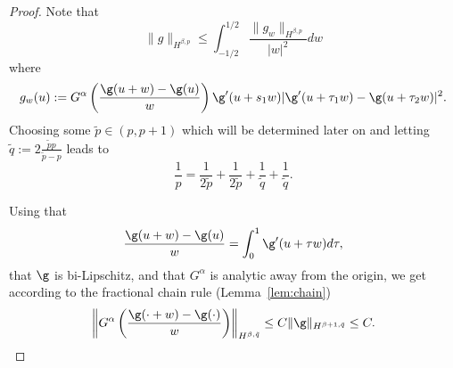 \begin{proof}
Note that
\begin{equation*}
  \|g\|_{H^{\beta , p}} \leq \int_{-1/2}^{1/2} \frac{\|g_w\|_{H^{\beta,p}}}{|w|^2} dw
\end{equation*}
where 
\begin{equation*}
 g_w(u) := G^{\alpha}\left(\frac {\g(u+w)-\g(u)} {w}\right) \g'(u+s_1 w )  |\g'(u+\tau_1 w)-\g(u+ \tau_2 w)|^2 .
\end{equation*}
Choosing some $\tilde p\in(p,p+1)$ which will be determined later on
and letting $\tilde q := 2\frac{\tilde pp}{\tilde p-p}$ leads to
\[ \frac1p = \frac1{2\tilde p} + \frac1{2\tilde p} + \frac1{\tilde q}
   + \frac1{\tilde q}. \]

Using that
\begin{equation*}
 \frac {\g(u+w)-\g(u)} {w} = \int_{0}^1 \g'(u+\tau w) d\tau,
\end{equation*}
that $\g$ is bi-Lipschitz, and that $G^\alpha$ is analytic away from the origin, 
we get according to the fractional chain rule (Lemma~\ref{lem:chain})
\begin{equation*}
 \left\|G^{\alpha}\left(\frac {\g(\cdot +w)-\g(\cdot)}{w}\right)\right\|_{H^{\beta,\tilde q}}
 \leq C \|\g\|_{H^{\beta+1,\tilde q}}
  \leq C.
\end{equation*}


\end{proof}
